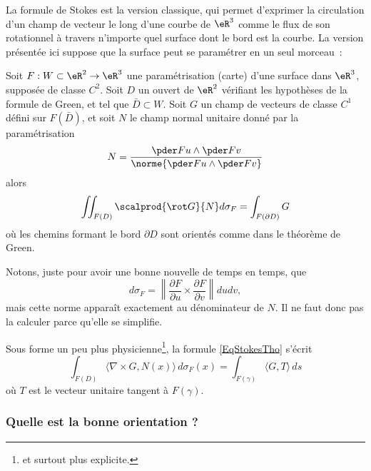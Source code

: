 La formule de Stokes est la version classique, qui permet d'exprimer la circulation d'un champ de vecteur le long d'une courbe de $\eR^3$ comme le flux de son rotationnel à travers n'importe quel surface dont le bord est la courbe. La version présentée ici suppose que la surface peut se paramétrer en un seul morceau~:
\begin{theorem}
  Soit $F : W\subset \eR^2 \to \eR^3$ une paramétrisation (carte) d'une surface dans $\eR^3$, supposée de classe $C^2$. Soit $D$ un ouvert de $\eR^2$ vérifiant les hypothèses de la formule de Green, et tel que $\bar D \subset W$. Soit $G$ un champ de vecteurs de classe $C^1$ défini sur $F(\bar D)$, et soit $N$ le champ normal unitaire donné par la paramétrisation
  \begin{equation}		
	N = \frac{\pder F u \wedge \pder F v}{\norme{\pder F u \wedge \pder F v}}
\end{equation}
  alors
  \begin{equation}\label{EqStokesTho}
    \iint_{F(D)} \scalprod{\rot G}{N} d\sigma_F = \int_{F(\partial D)} G
  \end{equation}
  où les chemins formant le bord $\partial D$ sont orientés comme dans le théorème de Green.
\end{theorem}
Notons, juste pour avoir une bonne nouvelle de temps en temps, que 
\begin{equation}
	d\sigma_F=\left\| \frac{ \partial F }{ \partial u }\times\frac{ \partial F }{ \partial v }  \right\|dudv,
\end{equation}
mais cette norme apparaît exactement au dénominateur de $N$. Il ne faut donc pas la calculer parce qu'elle se simplifie.

Sous forme un peu plus physicienne\footnote{et surtout plus explicite.}, la formule \eqref{EqStokesTho} s'écrit
\begin{equation}
	\int_{F(D)}\langle \nabla\times G, N(x)\rangle\, d\sigma_F(x)=\int_{F(\gamma)}\langle G, T\rangle\, ds
\end{equation}
où $T$ est le vecteur unitaire tangent à $F(\gamma)$.

\subsubsection{Quelle est la bonne orientation ?}


